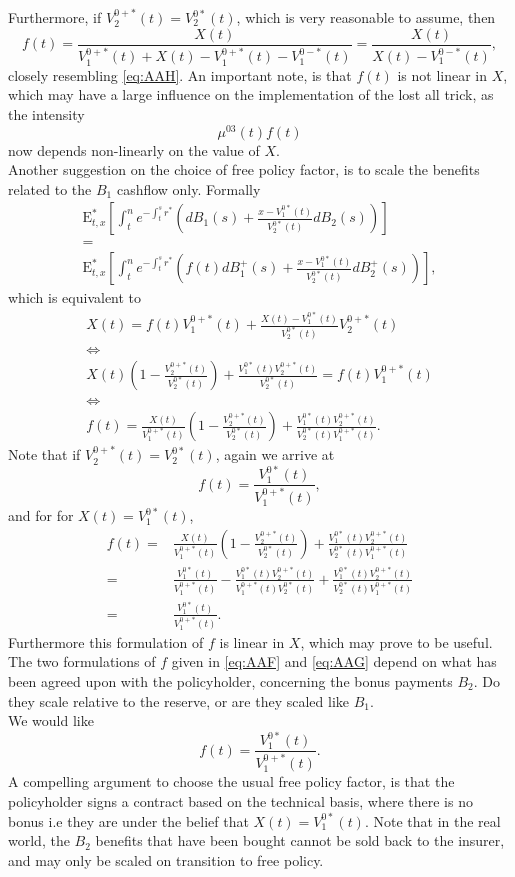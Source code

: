 \documentclass[12pt]{article}
\newcommand{\E}{\text{E}}
\newcommand\ddfrac[2]{\frac{\displaystyle #1}{\displaystyle #2}}
\begin{document}
Furthermore, if $V_2^{0+*}(t)=V_2^{0*}(t)$, which is very reasonable to assume, then
$$
f(t)=\ddfrac{X(t)}{V_1^{0+*}(t)+X(t)-V_1^{0+*}(t)-V_1^{0-*}(t)}=\ddfrac{X(t)}{X(t)-V_1^{0-*}(t)},
$$
closely resembling \eqref{eq:AAH}. An important note, is that $f(t)$ is not linear in $X$, which may have a large influence on the implementation of the lost all trick, as the intensity
$$
\mu^{03}(t)f(t)
$$
now depends non-linearly on the value of $X$. 
\\
Another suggestion on the choice of free policy factor, is to scale the benefits related to the $B_1$ cashflow only. Formally
\begin{gather*}
\E^*_{t,x} \left[ \int_t^n e^{-\int_t^sr^*} \left( dB_1(s) + \frac{x-V_1^{0*}(t)}{V_2^{0*}(t)} dB_2(s) \right)  \right]
\\
=
\\
\E^*_{t,x} \left[ \int_t^n e^{-\int_t^sr^*}  \left( f(t) dB_1^+(s) + \frac{x-V_1^{0*}(t)}{V_2^{0*}(t)} dB_2^+(s) \right)  \right],
\end{gather*}
which is equivalent to
\begin{gather}
X(t)=f(t)V_1^{0+*}(t)+\frac{X(t)-V_1^{0*}(t)}{V_2^{0*}(t)}V_2^{0+*}(t)
\nonumber
\\
\nonumber
\Leftrightarrow
\\
\nonumber
X(t) \left( 1-\frac{V_2^{0+*}(t)}{V_2^{0*}(t)} \right) +\frac{V_1^{0*}(t)V_2^{0+*}(t)}{V_2^{0*}(t)} =f(t)V_1^{0+*}(t)
\\
\nonumber
\Leftrightarrow
\\
f(t)= \frac{X(t)}{V_1^{0+*}(t)} \left( 1-\frac{V_2^{0+*}(t)}{V_2^{0*}(t)} \right) +\frac{V_1^{0*}(t)V_2^{0+*}(t)}{V_2^{0*}(t)V_1^{0+*}(t)}  .\label{eq:AAG}
\end{gather}
Note that if $V_2^{0+*}(t)=V_2^{0*}(t)$, again we arrive at
$$
f(t)=\ddfrac{V_1^{0*}(t)}{V_1^{0+*}(t)},
$$
and for for $X(t)=V_1^{0*}(t)$,
\begin{align*}
f(t)=& \frac{X(t)}{V_1^{0+*}(t)} \left( 1-\frac{V_2^{0+*}(t)}{V_2^{0*}(t)} \right) +\frac{V_1^{0*}(t)V_2^{0+*}(t)}{V_2^{0*}(t)V_1^{0+*}(t)}
\\
=&\frac{V_1^{0*}(t)}{V_1^{0+*}(t)} -\frac{V_1^{0*}(t)V_2^{0+*}(t)}{V_1^{0+*}(t)V_2^{0*}(t)}  +\frac{V_1^{0*}(t)V_2^{0+*}(t)}{V_2^{0*}(t)V_1^{0+*}(t)}
\\
=&
\ddfrac{V_1^{0*}(t)}{V_1^{0+*}(t)}.
\end{align*}
Furthermore this formulation of $f$ is linear in $X$, which may prove to be useful. The two formulations of $f$ given in \eqref{eq:AAF} and \eqref{eq:AAG} depend on what has been agreed upon with the policyholder, concerning the bonus payments $B_2$. Do they scale relative to the reserve, or are they scaled like $B_1$.
\\
 We would like $$
f(t)=\ddfrac{V_1^{0*}(t)}{V_1^{0+*}(t)}.
$$
A compelling argument to choose the usual free policy factor, is that the policyholder signs a contract based on the technical basis, where there is no bonus i.e they are under the belief that $X(t)=V_1^{0*}(t)$. Note that in the real world, the $B_2$ benefits that have been bought cannot be sold back to the insurer, and may only be scaled on transition to free policy.
\end{document}
